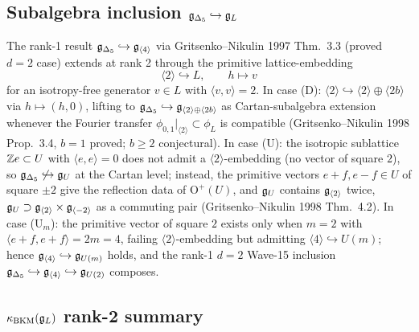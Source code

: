 \subsection*{Subalgebra inclusion $\mathfrak{g}_{\Delta_5} \hookrightarrow \mathfrak{g}_L$}

The rank-1 result $\mathfrak{g}_{\Delta_5} \hookrightarrow \mathfrak{g}_{\langle 4 \rangle}$
via Gritsenko--Nikulin 1997 Thm.~3.3 (proved $d=2$ case) extends at rank 2
through the primitive lattice-embedding
\[
 \langle 2 \rangle \hookrightarrow L, \qquad h \mapsto v
\]
for an isotropy-free generator $v \in L$ with $\langle v, v \rangle = 2$.
In case (D): $\langle 2 \rangle \hookrightarrow \langle 2 \rangle \oplus
\langle 2b \rangle$ via $h \mapsto (h, 0)$, lifting to
$\mathfrak{g}_{\Delta_5} \hookrightarrow \mathfrak{g}_{\langle 2 \rangle \oplus
\langle 2b \rangle}$ as Cartan-subalgebra extension whenever the Fourier
transfer $\phi_{0,1}|_{\langle 2 \rangle} \subset \phi_L$ is compatible
(Gritsenko--Nikulin 1998 Prop.~3.4, $b = 1$ proved; $b \geq 2$ conjectural).
In case (U): the isotropic sublattice $\mathbb{Z} e \subset U$ with
$\langle e, e \rangle = 0$ does not admit a $\langle 2 \rangle$-embedding
(no vector of square $2$), so $\mathfrak{g}_{\Delta_5} \not\hookrightarrow
\mathfrak{g}_U$ at the Cartan level; instead, the primitive vectors
$e + f, e - f \in U$ of square $\pm 2$ give the reflection data of
$\mathrm{O}^+(U)$, and $\mathfrak{g}_U$ contains $\mathfrak{g}_{\langle 2 \rangle}$
twice, $\mathfrak{g}_U \supset \mathfrak{g}_{\langle 2 \rangle} \times
\mathfrak{g}_{\langle -2 \rangle}$ as a commuting pair
(Gritsenko--Nikulin 1998 Thm.~4.2). In case (U$_m$): the primitive
vector of square $2$ exists only when $m = 2$ with $\langle e + f, e + f \rangle = 2m = 4$,
failing $\langle 2 \rangle$-embedding but admitting $\langle 4 \rangle
\hookrightarrow U(m)$; hence $\mathfrak{g}_{\langle 4 \rangle} \hookrightarrow
\mathfrak{g}_{U(m)}$ holds, and the rank-1 $d=2$ Wave-15 inclusion
$\mathfrak{g}_{\Delta_5} \hookrightarrow \mathfrak{g}_{\langle 4 \rangle} \hookrightarrow
\mathfrak{g}_{U(2)}$ composes.

\subsection*{$\kappa_{\mathrm{BKM}}(\mathfrak{g}_L)$ rank-2 summary}

